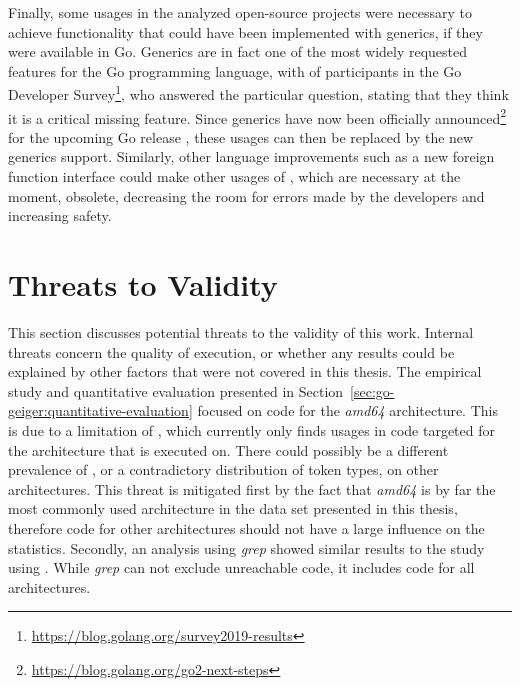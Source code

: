 Finally, some \unsafe{} usages in the analyzed open-source projects were necessary to achieve functionality that could
have been implemented with generics, if they were available in Go.
Generics are in fact one of the most widely requested features for the Go programming language, with  of
participants in the  Go Developer Survey\footnote{\url{https://blog.golang.org/survey2019-results}},
who answered the particular question, stating that they think it is a critical missing feature.
Since generics have now been officially announced\footnote{\url{https://blog.golang.org/go2-next-steps}} for the
upcoming Go release , these \unsafe{} usages can then be replaced by the new generics support.
Similarly, other language improvements such as a new foreign function interface could make other usages of \unsafe{},
which are necessary at the moment, obsolete, decreasing the room for errors made by the developers and increasing
safety.



\section{Threats to Validity}\label{sec:discussion:threats-to-validity}

This section discusses potential threats to the validity of this work.
Internal threats concern the quality of execution, or whether any results could be explained by other factors that were
not covered in this thesis.
The empirical study and quantitative evaluation presented in Section~\ref{sec:go-geiger:quantitative-evaluation}
focused on code for the \textit{amd64} architecture.
This is due to a limitation of \toolGeiger{}, which currently only finds \unsafe{} usages in code targeted for the
architecture that \toolGeiger{} is executed on.
There could possibly be a different prevalence of \unsafe{}, or a contradictory distribution of \unsafe{} token types,
on other architectures.
This threat is mitigated first by the fact that \textit{amd64} is by far the most commonly used architecture in the
data set presented in this thesis, therefore code for other architectures should not have a large influence on the
statistics.
Secondly, an analysis using \textit{grep} showed similar results to the study using \toolGeiger{}.
While \textit{grep} can not exclude unreachable code, it includes code for all architectures.

